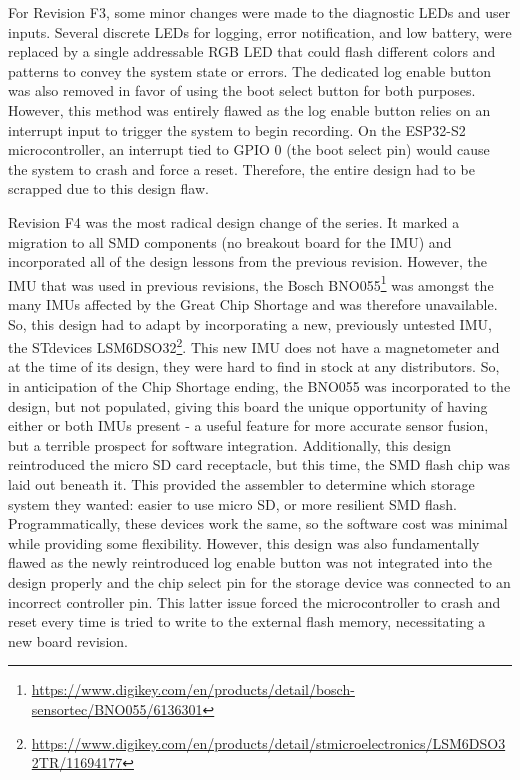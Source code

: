 
For Revision F3, some minor changes were made to the diagnostic LEDs and user inputs.
Several discrete LEDs for logging, error notification, and low battery, were replaced by a single addressable RGB LED that could flash different colors and patterns to convey the system state or errors.
The dedicated log enable button was also removed in favor of using the boot select button for both purposes.
However, this method was entirely flawed as the log enable button relies on an interrupt input to trigger the system to begin recording.
On the ESP32-S2 microcontroller, an interrupt tied to GPIO 0 (the boot select pin) would cause the system to crash and force a reset.
Therefore, the entire design had to be scrapped due to this design flaw.


Revision F4 was the most radical design change of the series.
It marked a migration to all SMD components (no breakout board for the IMU) and incorporated all of the design lessons from the previous revision.
However, the IMU that was used in previous revisions, the Bosch BNO055\footnote{\url{https://www.digikey.com/en/products/detail/bosch-sensortec/BNO055/6136301}} was amongst the many IMUs affected by the Great Chip Shortage and was therefore unavailable.
So, this design had to adapt by incorporating a new, previously untested IMU, the STdevices LSM6DSO32\footnote{\url{https://www.digikey.com/en/products/detail/stmicroelectronics/LSM6DSO32TR/11694177}}.
This new IMU does not have a magnetometer and at the time of its design, they were hard to find in stock at any distributors.
So, in anticipation of the Chip Shortage ending, the BNO055 was incorporated to the design, but not populated, giving this board the unique opportunity of having either or both IMUs present - a useful feature for more accurate sensor fusion, but a terrible prospect for software integration.
Additionally, this design reintroduced the micro SD card receptacle, but this time, the SMD flash chip was laid out beneath it.
This provided the assembler to determine which storage system they wanted: easier to use micro SD, or more resilient SMD flash.
Programmatically, these devices work the same, so the software cost was minimal while providing some flexibility.
However, this design was also fundamentally flawed as the newly reintroduced log enable button was not integrated into the design properly and the chip select pin for the storage device was connected to an incorrect controller pin.
This latter issue forced the microcontroller to crash and reset every time is tried to write to the external flash memory, necessitating a new board revision.

